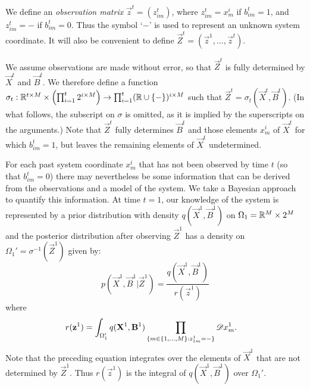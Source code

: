 We define an {\em observation matrix} $\vec{z}^t = (z^t_{im})$, where $z^t_{im} = x^i_m$ if $b^t_{im} = 1$, and $z^t_{im} = -$ if $b^t_{im} = 0$. Thus the symbol `$-$' is used to represent an unknown system coordinate. It will also be convenient to define $\vec{Z}^t = (\vec{z}^1,\ldots,\vec{z}^t)$. 

We assume observations are made without error, so that $\vec{Z}^t$ is fully determined by $\vec{X}^t$ and $\vec{B}^t$. We therefore define a function $\sigma_t: \mathbb R^{t \times M} \times \left( \prod_{i=1}^t 2^{i \times M} \right) \rightarrow \prod_{i=1}^t (\mathbb R \cup \{ - \})^{i \times M}$ such that $\vec{Z}^t = \sigma_t(\vec{X}^t, \vec{B}^t)$. (In what follows, the subscript on $\sigma$ is omitted, as it is implied by the superscripts on the arguments.) Note that $\vec{Z}^t$ fully determines $\vec{B}^t$ and those elements $x_m^i$ of $\vec{X}^t$ for which $b_{im}^t = 1$, but leaves the remaining elements of $\vec{X}^t$ undetermined.

For each past system coordinate $x^i_m$ that has not been observed by time $t$ (so that $b^t_{im} = 0$) there may nevertheless be some information that can be derived from the observations and a model of the system. We take a Bayesian approach to quantify this information. At time $t=1$, our knowledge of the system is represented by a prior distribution with density $q(\vec{X}^1, \vec{B}^1)$ on $\Omega_1 = \mathbb R^M \times 2^M$ and the posterior distribution after observing $\vec{Z}^1$ has a density on $\Omega_1' = \sigma^{-1}(\vec{Z}^1)$ given by:
\begin{equation*}
    p(\vec{X}^1, \vec{B}^1 |\vec{Z}^1) =
        \frac{q(\vec{X}^1, \vec{B}^1)}
        {r(\vec{z}^1)} 
\end{equation*}
where
\begin{align*}
    r(\mathbf{z}^1)  &= \int_{\Omega_1'} q(\mathbf{X}^1, \mathbf{B}^1) \prod_{ \{m \in \{1, \ldots, M \} : z^1_{1m} = - \} } \mathscr{D} x^1_m.
\end{align*}
Note that the preceding equation integrates over the elements of $\vec{X}^1$ that are not determined by $\vec{Z}^1$. Thus $r(\vec{z}^1)$ is the integral of $q(\vec{X}^1, \vec{B}^1)$ over $\Omega_1'$. 

